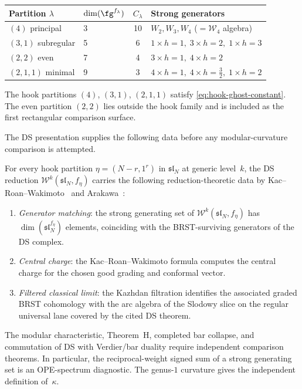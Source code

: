 \begin{computation}
\label{comp:sl4-hook-data}
\begin{center}
\begin{tabular}{llcl}
\toprule
Partition $\lambda$ & $\dim(\fg^{f_\lambda})$ & $C_\lambda$
 & Strong generators \\
\midrule
$(4)$ principal & 3 & 10
 & $W_2, W_3, W_4$ ($= \mathcal{W}_4$ algebra) \\
$(3,1)$ subregular & 5 & 6
 & $1 \times h\!=\!1,\; 3 \times h\!=\!2,\; 1 \times h\!=\!3$ \\
$(2,2)$ even & 7 & 4
 & $3 \times h\!=\!1,\; 4 \times h\!=\!2$ \\
$(2,1,1)$ minimal & 9 & 3
 & $4 \times h\!=\!1,\; 4 \times h\!=\!\tfrac32,\; 1 \times h\!=\!2$ \\
\bottomrule
\end{tabular}
\end{center}
The hook partitions $(4)$, $(3,1)$, $(2,1,1)$ satisfy
\eqref{eq:hook-ghost-constant}. The even partition $(2,2)$ lies outside the
hook family and is included as the first rectangular comparison surface.
\end{computation}

The DS presentation supplies the following data before any modular-curvature
comparison is attempted.

\begin{proposition}
\label{prop:ds-bar-hook-commutation}
For every hook partition $\eta = (N-r, 1^r)$ in
$\mathfrak{sl}_N$ at generic level~$k$, the DS reduction
$\mathcal{W}^k(\mathfrak{sl}_N, f_\eta)$ carries the following
reduction-theoretic data by Kac--Roan--Wakimoto~\cite{KRW03} and
Arakawa~\cite{Arakawa07}:
\begin{enumerate}[label=\textup{(\roman*)}]
\item \emph{Generator matching}: the strong generating set of
 $\mathcal{W}^k(\mathfrak{sl}_N, f_\eta)$ has
 $\dim(\mathfrak{sl}_N^{f_\eta})$ elements, coinciding with the
 BRST-surviving generators of the DS complex.
\item \emph{Central charge}: the Kac--Roan--Wakimoto formula computes
 the central charge for the chosen good grading and conformal vector.
\item \emph{Filtered classical limit}: the Kazhdan filtration identifies the
 associated graded BRST cohomology with the arc algebra of the Slodowy slice
 on the regular universal lane covered by the cited DS theorem.
\end{enumerate}
The modular characteristic, Theorem~H, completed bar collapse, and
commutation of DS with Verdier/bar duality require independent comparison
theorems.  In particular, the reciprocal-weight signed sum of a strong
generating set is an OPE-spectrum diagnostic.  The genus-$1$ curvature gives
the independent definition of~$\kappa$.
\end{proposition}

